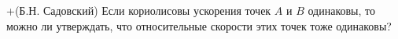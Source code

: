 +(Б.Н. Садовский)
Если кориолисовы ускорения точек $A$ и $B$ одинаковы, то можно ли 
утверждать, что относительные скорости этих точек тоже одинаковы?
